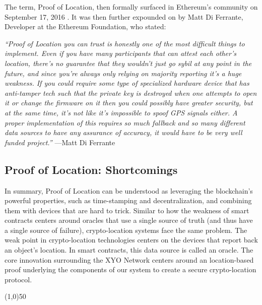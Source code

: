 \documentclass{article}
\begin{document}
The term, Proof of Location, then formally surfaced in Ethereum's community on September 17, 2016 \cite{diferrante-proofoflocation}. It was then further expounded on by Matt Di Ferrante, Developer at the Ethereum Foundation, who stated:

\begin{displayquote}\textit{``Proof of Location you can trust is honestly one of the most difficult things to implement. Even if you have many participants that can attest each other's location, there's no guarantee that they wouldn't just go sybil at any point in the future, and since you're always only relying on majority reporting it's a huge weakness.
If you could require some type of specialized hardware device that has anti-tamper tech such that the private key is destroyed when one attempts to open it or change the firmware on it then you could possibly have greater security, but at the same time, it's not like it's impossible to spoof GPS signals either.
A proper implementation of this requires so much fallback and so many different data sources to have any assurance of accuracy, it would have to be very well funded project.''}
\vspace{2mm}
---Matt Di Ferrante
\end{displayquote}


\subsection {Proof of Location: Shortcomings}

In summary, Proof of Location can be understood as leveraging the blockchain's powerful properties, such as time-stamping and decentralization, and combining them with devices that are hard to trick. Similar to how the weakness of smart contracts centers around oracles that use a single source of truth (and thus have a single source of failure), crypto-location systems face the same problem. The weak point in crypto-location technologies centers on the devices that report back an object's location. In smart contracts, this data source is called an oracle. The core innovation surrounding the XYO Network centers around an location-based proof underlying the components of our system to create a secure crypto-location protocol.

\begin{center}
\line(1,0){50}
\end{center}
\end{document}
